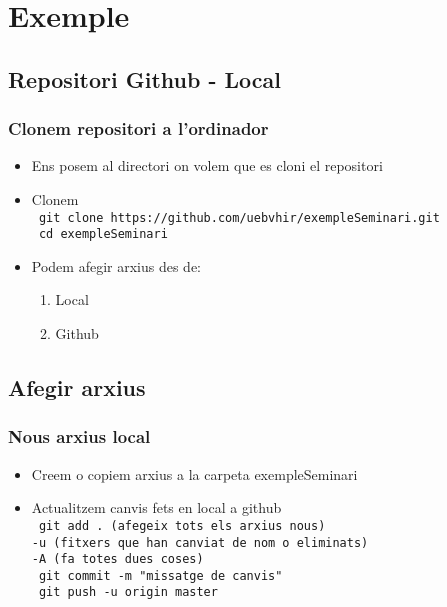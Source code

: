 \documentclass{beamer}
\newcommand{\shellcmd}[1]{{\color{blue}\indent\indent\texttt{\footnotesize\ #1}\\}}
\begin{document}
\section{Exemple}
\subsection{Repositori Github - Local}
\begin{frame}
	\frametitle{Clonem repositori a l'ordinador}
	\begin{itemize}
		\item Ens posem al directori on volem que es cloni el repositori
		\item Clonem\\
		\shellcmd{git clone https://github.com/uebvhir/exempleSeminari.git}
		\shellcmd{cd exempleSeminari}\vspace{0.2cm}
		\item Podem afegir arxius des de: 
		\begin{enumerate}
			\item Local
			\item Github
		\end{enumerate}
	\end{itemize}	
\end{frame}

\subsection{Afegir arxius}
\begin{frame}
	\frametitle{Nous arxius local}
	\begin{itemize}
		\item Creem o copiem arxius a la carpeta exempleSeminari
		\item Actualitzem canvis fets en local a github\\
		\shellcmd{git add . (afegeix tots els arxius nous)\\
			\hspace{1.5cm}-u (fitxers que han canviat de nom o eliminats)\\
			\hspace{1.5cm}-A (fa totes dues coses)}
		\shellcmd{git commit -m "missatge de canvis"}
		\shellcmd{git push -u origin master}

	\end{itemize}	
\end{frame}
\end{document}
